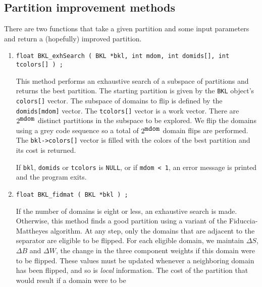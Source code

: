 \subsection{Partition improvement methods}
\label{subsection:BKL:proto:improve}
\par
There are two functions that take a given partition and some input
parameters and return a (hopefully) improved partition.
\par
\begin{enumerate}
\item
\begin{verbatim}
float BKL_exhSearch ( BKL *bkl, int mdom, int domids[], int tcolors[] ) ;
\end{verbatim}
This method performs an exhaustive search of a subspace of
partitions and returns the best partition.
The starting partition is given by the {\tt BKL} object's {\tt
colors[]} vector.
The subspace of domains to flip is defined by the {\tt
domids[mdom]} vector.
The {\tt tcolors[]} vector is a work vector.
There are $2^{\mbox{\tt mdom}}$ distinct partitions in the subspace
to be explored.
We flip the domains using a grey code sequence so a total of
$2^{\mbox{\tt mdom}}$ domain flips are performed.
The {\tt bkl->colors[]} vector is filled with the colors of
the best partition and its cost is returned.
\par {}
If {\tt bkl}, {\tt domids} or {\tt tcolors} is {\tt NULL},
or if {\tt mdom < 1},
an error message is printed and the program exits.
\item
\begin{verbatim}
float BKL_fidmat ( BKL *bkl ) ;
\end{verbatim}
If the number of domains is eight or less, an exhaustive search is
made.
Otherwise, this method finds a good partition using a variant of the
Fiduccia-Mattheyes algorithm.
At any step, only the domains that are adjacent to the separator
are eligible to be flipped.
For each eligible domain,
we maintain 
$\Delta S$, $\Delta B$ and $\Delta W$,
the change in the three component weights
if this domain were to be flipped.
These values must be updated whenever a neighboring domain has been
flipped, and so is {\it local} information.
The cost of the partition that would result if a domain were to be

\end{enumerate}

